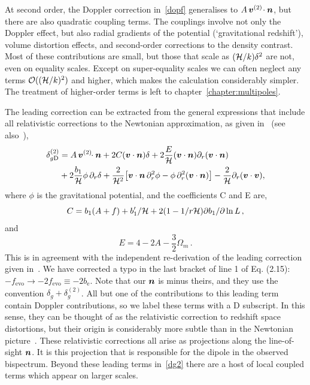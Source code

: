 At second order, the Doppler correction in~\eqref{dopf} generalises to $A\, \bm{v}^{(2)}\!\cdot\bm {n}$, but there are also quadratic coupling terms. The couplings involve not only the Doppler effect, but also radial gradients of the potential (`gravitational redshift'), volume distortion effects, and second-order corrections to the density contrast. Most of these contributions are small, but those that scale as $(\mathcal{H}/k)\delta^2$ are not, even on equality scales. Except on super-equality scales we can often neglect any terms $\mathcal{O}((\mathcal{H}/k)^{2})$ and higher, which makes the calculation considerably simpler. The treatment of higher-order terms is left to chapter~\ref{chapter:multipoles}.

The leading correction can be extracted from the general expressions that include all relativistic  corrections to the Newtonian approximation, as given in~\cite{Bertacca:2014hwa} (see also~\cite{Bertacca:2014dra,Yoo:2014sfa,DiDio:2014lka,Jolicoeur:2017nyt,DiDio:2018zmk}), 
\begin{align}
\delta^{(2)}_{g{\mathrm{D}}} &= A \, \bm{v}^{(2)}\!\!\cdot\bm {n}+2{C}(\bm{v}\cdot\bm {n})\delta +2 {\frac{E}{\mathcal{H}}}(\bm{v}\cdot\bm {n})\partial_r(\bm{v}\cdot\bm {n})\label{dg2}
\\ & \nonumber
+ 2 \frac{b_1}{\mathcal{H}}\phi\, \partial_r\delta
+ \frac{2}{\mathcal{H}^2} \big[\bm{v}\cdot\bm {n} \,\partial_r^2\phi-\phi\, \partial_r^2 (\bm{v}\cdot\bm {n}) \big] - \frac{2}{\mathcal{H}}\partial_r (\bm{v}\cdot\bm{v}), 
\end{align}
where $\phi$ is the gravitational potential, and the coefficients C and E are,
\begin{equation}
    C = b_1(A + f)+{b_1'/ \mathcal{H}}+ 2(1-{1/ r\mathcal{H}} ){\partial b_1/ \partial\ln L}\,,
\end{equation}
and
\begin{equation}
E = {4-2A-{\frac{3}{2}}\Omega_m}\,.
\end{equation}
This is in agreement with the independent re-derivation of the leading correction given in~\cite{DiDio:2018zmk}. We have corrected a typo in the last bracket of line 1 of Eq. (2.15): $-f_{\mathrm{evo}}\to -2f_{\mathrm{evo}}\equiv -2b_{\mathrm{e}}$. Note that our $\bm {n}$ is minus theirs, and they use the convention $\delta_g+\delta^{(2)}_g$.
All but one of the contributions to this leading term contain Doppler contributions, so we label these terms with a D subscript. In this sense, they can be thought of as the relativistic correction to redshift space distortions, but their origin is considerably more subtle than in the Newtonian picture~\citep{Bertacca:2014dra,DiDio:2018zmk}. These relativistic corrections all arise as projections along the line-of-sight $\bm {n}$. It is this projection that is responsible for the dipole in the observed bispectrum. Beyond these leading terms in~\eqref{dg2} there are a host of local coupled terms which appear on larger scales. 

